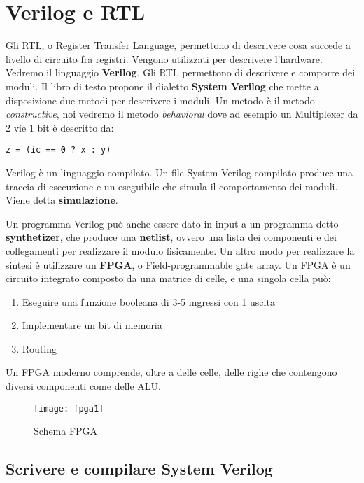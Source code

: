 \chapter{Verilog e RTL}

Gli RTL, o Register Transfer Language, permettono di descrivere cosa succede a livello di circuito fra registri. Vengono utilizzati per descrivere l'hardware. Vedremo il linguaggio \textbf{Verilog}. Gli RTL permettono di descrivere e comporre dei moduli. Il libro di testo propone il dialetto \textbf{System Verilog} che mette a disposizione due metodi per descrivere i moduli. Un metodo è il metodo \textit{constructive}, noi vedremo il metodo \textit{behavioral} dove ad esempio un Multiplexer da 2 vie 1 bit è descritto da:
\begin{lstlisting}[style={verilog}]
	z = (ic == 0 ? x : y)
\end{lstlisting}

Verilog è un linguaggio compilato. Un file System Verilog compilato produce una traccia di esecuzione e un eseguibile che simula il comportamento dei moduli. Viene detta \textbf{simulazione}.

Un programma Verilog può anche essere dato in input a un programma detto \textbf{synthetizer}, che produce una \textbf{netlist}, ovvero una lista dei componenti e dei collegamenti per realizzare il modulo fisicamente. Un altro modo per realizzare la sintesi è utilizzare un \textbf{FPGA}, o Field-programmable gate array. Un FPGA è un circuito integrato composto da una matrice di celle, e una singola cella può:
\begin{enumerate}
	\item Eseguire una funzione booleana di 3-5 ingressi con 1 uscita 
	\item Implementare un bit di memoria
	\item Routing
\end{enumerate} 

Un FPGA moderno comprende, oltre a delle celle, delle righe che contengono diversi componenti come delle ALU.

\begin{figure}[H]
	\centering
	\texttt{[image: fpga1]}
	\caption{Schema FPGA}
\end{figure}

\section{Scrivere e compilare System Verilog}

